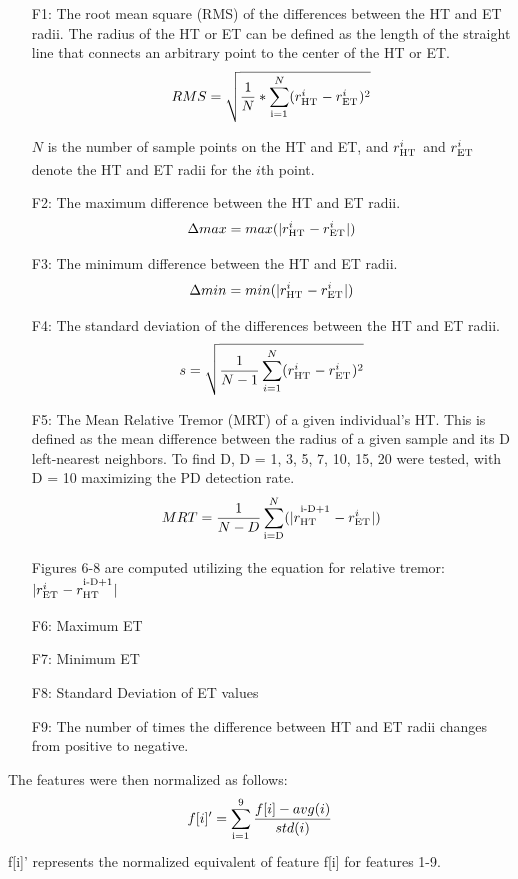 \documentclass[pmlr,twocolumn,10pt]{jmlr} %
\let\SUP\textsuperscript
\newcommand\red[1]{{\color{red}#1}}
\begin{document}
\begin{enumerate}
\item[F1:] The root mean square (RMS) of the differences between the HT and ET radii. The radius of the HT or ET can be defined as the length of the straight line that connects an arbitrary point to the center of the HT or ET. 
\[RMS = \sqrt{\frac{1}{N} * \sum_\SUP{i=1}^N(r_\SUP{HT}^i - r_\SUP{ET}^i)^2}\]

$N$ is the number of sample points on the HT and ET, and $r_\SUP{HT}^i$ and $r_\SUP{ET}^i$ denote the HT and ET radii for the $i$th point.

\item[F2:] The maximum difference between the HT and ET radii. 
\[\Delta max = max(|r_\SUP{HT}^i - r_\SUP{ET}^i|)\]

\item[F3:] The minimum difference between the HT and ET radii. 
\[\Delta min = min(|r_\SUP{HT}^i - r_\SUP{ET}^i|)\]

\item[F4:] The standard deviation of the differences between the HT and ET radii. 
\[s = \sqrt{\frac{1}{N-1}\sum_{i=1}^N(r_\SUP{HT}^i - r_\SUP{ET}^i)^2}\]

\item[F5:] The Mean Relative Tremor (MRT) of a given individual’s HT. This is defined as the mean difference between the radius of a given sample and its D left-nearest neighbors. To find D, D = {1, 3, 5, 7, 10, 15, 20} were tested, with D = 10 maximizing the PD detection rate. 
\[MRT = \frac{1}{N-D}\sum_\SUP{i=D}^N(|r_\SUP{HT}^\SUP{i-D+1} - r_\SUP{ET}^i|)\]

Figures 6-8 are computed utilizing the equation for relative tremor: $|r_\SUP{ET}^i - r_\SUP{HT}^\SUP{i-D+1}|$
\item[F6:] Maximum ET
\item[F7:] Minimum ET
\item[F8:] Standard Deviation of ET values
\item[F9:] The number of times the difference between HT and ET radii changes from positive to negative.
\end{enumerate}

The features were then normalized as follows:
\[f[i]' = \sum_\SUP{i=1}^9\frac{f[i] - avg(i)}{std(i)}\]
f[i]' represents the normalized equivalent of feature f[i] for features 1-9.
\end{document}

